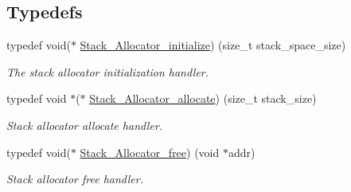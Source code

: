 \subsection*{Typedefs}
\begin{DoxyCompactItemize}
\item 
typedef void($\ast$ \mbox{\hyperlink{group__RTEMSScoreStack_ga0b4e6be94e46e4f0a9e862e1f818d28b}{Stack\+\_\+\+Allocator\+\_\+initialize}}) (size\+\_\+t stack\+\_\+space\+\_\+size)
\begin{DoxyCompactList}\small\item\em The stack allocator initialization handler. \end{DoxyCompactList}\item 
typedef void $\ast$($\ast$ \mbox{\hyperlink{group__RTEMSScoreStack_ga1e4edf42aa30aeab80fefb866e892a3d}{Stack\+\_\+\+Allocator\+\_\+allocate}}) (size\+\_\+t stack\+\_\+size)
\begin{DoxyCompactList}\small\item\em Stack allocator allocate handler. \end{DoxyCompactList}\item 
typedef void($\ast$ \mbox{\hyperlink{group__RTEMSScoreStack_ga2bc90d7062b3eba257c6e2e3836deb8b}{Stack\+\_\+\+Allocator\+\_\+free}}) (void $\ast$addr)
\begin{DoxyCompactList}\small\item\em Stack allocator free handler. \end{DoxyCompactList}\end{DoxyCompactItemize}
